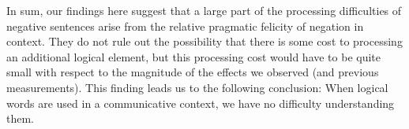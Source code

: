\documentclass[man, noapacite]{apa2}
\begin{document}
In sum, our findings here suggest that a large part of the processing difficulties of negative sentences arise from the relative pragmatic felicity of negation in context. They do not rule out the possibility that there is some cost to processing an additional logical element, but this processing cost would have to be quite small with respect to the magnitude of the effects we observed (and previous measurements). This finding leads us to the following conclusion: When logical words are used in a communicative context, we have no difficulty understanding them.





\end{document}
